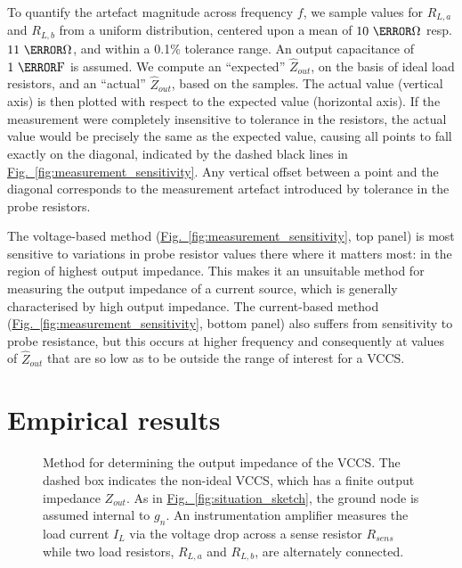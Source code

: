 \documentclass[conference]{IEEEtran}
\newcommand{\brieffiglink}[1]{\hyperref[#1]{Fig.~\ref*{#1}}}
\begin{document}
To quantify the artefact magnitude across frequency $f$, we sample values for $R_{L,a}$ and $R_{L,b}$ from a uniform distribution, centered upon a mean of $10~\kilo\ohm$ resp. $11~\kilo\ohm$, and within a 0.1\% tolerance range. An output capacitance of $1~\nano\farad$ is assumed. We compute an ``expected'' $\hat{Z}_{out}$, on the basis of ideal load resistors, and an ``actual'' $\hat{Z}_{out}$, based on the samples. The actual value (vertical axis) is then plotted with respect to the expected value (horizontal axis). If the measurement were completely insensitive to tolerance in the resistors, the actual value would be precisely the same as the expected value, causing all points to fall exactly on the diagonal, indicated by the dashed black lines in \brieffiglink{fig:measurement_sensitivity}. Any vertical offset between a point and the diagonal corresponds to the measurement artefact introduced by tolerance in the probe resistors.

The voltage-based method (\brieffiglink{fig:measurement_sensitivity}, top panel) is most sensitive to variations in probe resistor values there where it matters most: in the region of highest output impedance. This makes it an unsuitable method for measuring the output impedance of a current source, which is generally characterised by high output impedance. The current-based method (\brieffiglink{fig:measurement_sensitivity}, bottom panel) also suffers from sensitivity to probe resistance, but this occurs at higher frequency and consequently at values of $\hat{Z}_{out}$ that are so low as to be outside the range of interest for a VCCS.

\section{Empirical results}
\label{sec:empirical-results}

\begin{figure}[b!]
\centering
{}
\scalebox{.75}{%

}
\caption{\small Method for determining the output impedance of the VCCS. The dashed box indicates the non-ideal VCCS, which has a finite output impedance $Z_{out}$. As in \brieffiglink{fig:situation_sketch}, the ground node is assumed internal to $g_n$. An instrumentation amplifier measures the load current $I_L$ via the voltage drop across a sense resistor $R_{sens}$ while two load resistors, $R_{L,a}$ and $R_{L,b}$, are alternately connected.}
\label{fig:vccs_output_current}
\end{figure}
\end{document}
